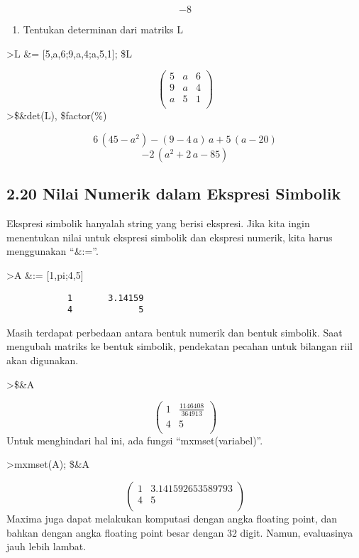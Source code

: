 \documentclass[
]{book}
\providecommand{\tightlist}{%
  \setlength{\itemsep}{0pt}\setlength{\parskip}{0pt}}
\begin{document}
\[-8\]

\begin{enumerate}
\def\labelenumi{\arabic{enumi}.}
\setcounter{enumi}{3}
\tightlist
\item
  Tentukan determinan dari matriks L
\end{enumerate}

\textgreater L \&= {[}5,a,6;9,a,4;a,5,1{]}; \$L

\[\begin{pmatrix}5 & a & 6 \\ 9 & a & 4 \\ a & 5 & 1 \\ \end{pmatrix}\]\textgreater\$\&det(L), \$factor(\%)

\[6\,\left(45-a^2\right)-\left(9-4\,a\right)\,a+5\,\left(a-20\right)\] \[-2\,\left(a^2+2\,a-85\right)\]

\subsection{2.20 Nilai Numerik dalam Ekspresi Simbolik}\label{nilai-numerik-dalam-ekspresi-simbolik}

Ekspresi simbolik hanyalah string yang berisi ekspresi. Jika kita ingin menentukan nilai untuk ekspresi simbolik dan ekspresi numerik, kita harus menggunakan ``\&:=''.

\textgreater A \&:= {[}1,pi;4,5{]}

\begin{verbatim}
            1       3.14159 
            4             5 
\end{verbatim}

Masih terdapat perbedaan antara bentuk numerik dan bentuk simbolik. Saat mengubah matriks ke bentuk simbolik, pendekatan pecahan untuk bilangan riil akan digunakan.

\textgreater\$\&A

\[\begin{pmatrix}1 & \frac{1146408}{364913} \\ 4 & 5 \\ \end{pmatrix}\]Untuk menghindari hal ini, ada fungsi ``mxmset(variabel)''.

\textgreater mxmset(A); \$\&A

\[\begin{pmatrix}1 & 3.141592653589793 \\ 4 & 5 \\ \end{pmatrix}\]Maxima juga dapat melakukan komputasi dengan angka floating point, dan bahkan dengan angka floating point besar dengan 32 digit. Namun, evaluasinya jauh lebih lambat.
\end{document}
